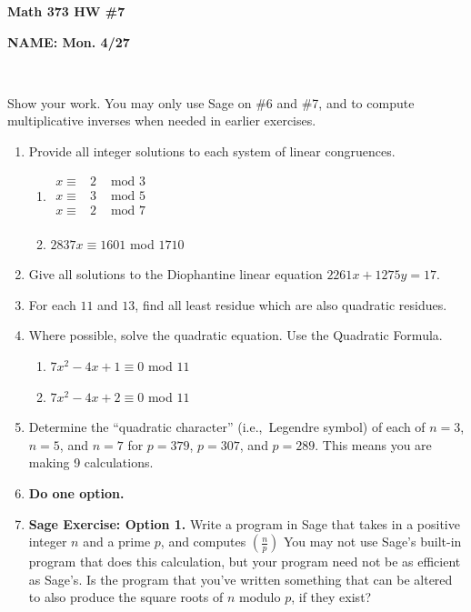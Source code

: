 \documentclass[11 pt]{article}
\theoremstyle{definition}
\theoremstyle{definition}
\def\ie{{i.e.,}\ }
\begin{document}
\centerline{\bf Math 373  \hfill HW \#7}
\centerline{\bf NAME: \hfill Mon. 4/27}

\

\noindent
Show your work.  You may only use Sage on \#6 and \#7, and to compute multiplicative inverses when needed in earlier exercises.  

\begin{enumerate}
\item Provide all integer solutions to each system of linear congruences.
	\begin{enumerate}
	\item $
\begin{array}{rcl}
x \equiv & 2 & \textrm{ mod } 3\\
x \equiv & 3 & \textrm{ mod } 5\\
x \equiv & 2 & \textrm{ mod } 7\\
\end{array}
$
%
	\item $2837x \equiv 1601$ mod $1710$
	\end{enumerate}

\item Give all solutions to the Diophantine linear equation $2261x + 1275y = 17$.

\item For each $11$ and $13$, find all least residue which are also quadratic residues.

\item Where possible, solve the quadratic equation.  Use the Quadratic Formula.
	\begin{enumerate}
	\item $7x^2 -4x + 1 \equiv 0$ mod $11$
	\item $7x^2 - 4x + 2 \equiv 0$ mod $11$
	\end{enumerate}
	
\item Determine the ``quadratic character'' (\ie Legendre symbol) of each of $n = 3$, $n = 5$, and $n = 7$ for $p = 379$, $p = 307$, and $p = 289$.  This means you are making 9 calculations.

\item {\bf Do one option.}

\item[] {\bf Sage Exercise: Option 1.}  Write a program in Sage that takes in a positive integer $n$ and a prime $p$, and computes $\left( \frac{n}{p} \right)$  You may not use Sage's built-in program that does this calculation, but your program need not be as efficient as Sage's.  Is the program that you've written something that can be altered to also produce the square roots of $n$ modulo $p$, if they exist?  


\end{enumerate}
\end{document}
